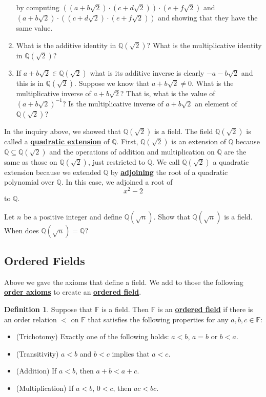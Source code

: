 \documentclass[11pt]{article}
\newenvironment{task}
	{\begin{mdframed}[linecolor=lightgray, linewidth=3pt]\raggedright}
	{\end{mdframed}}
\renewcommand\emph[1]{\underline{\bf{#1}}} %
\theoremstyle{definition}
\newtheorem{definition}[theorem]{Definition}
\begin{document}
\begin{task}
\begin{enumerate}
      by computing $((a+b\sqrt{2})\cdot (c+d\sqrt{2}))\cdot (e + f\sqrt{2})$ and $(a+b\sqrt{2})\cdot ( (c+d\sqrt{2})\cdot (e+f\sqrt{2}) )$ and showing that 
      they have the same value.
    \item What is the additive identity in $\mathbb{Q}(\sqrt{2})$? What is the multiplicative identity in $\mathbb{Q}(\sqrt{2})$?
    \item If $a+b\sqrt{2}\in \mathbb{Q}(\sqrt{2})$ what is its additive inverse is clearly $-a-b\sqrt{2}$ and this is in $\mathbb{Q}(\sqrt{2})$. Suppose
      we know that $a+b\sqrt{2} \neq 0$. What is the multiplicative inverse of $a+b\sqrt{2}$? That is, what is the value of $(a+b\sqrt{2})^{-1}$? Is
      the multiplicative inverse of $a+b\sqrt{2}$ an element of $\mathbb{Q}(\sqrt{2})$?
  \end{enumerate}

\end{task}

In the inquiry above, we showed that $\mathbb{Q}(\sqrt{2})$ is a field.  The field $\mathbb{Q}(\sqrt{2})$ is called a \emph{quadratic extension}
of $\mathbb{Q}$. First, $\mathbb{Q}(\sqrt{2})$ is an extension of $\mathbb{Q}$ because $\mathbb{Q}\subseteq \mathbb{Q}(\sqrt{2})$ and the operations of addition and
multiplication on $\mathbb{Q}$ are the same as those on $\mathbb{Q}(\sqrt{2})$, just restricted to $\mathbb{Q}$. We call $\mathbb{Q}(\sqrt{2})$ a
quadratic extension because we extended $\mathbb{Q}$ by \emph{adjoining} the root of a quadratic polynomial over $\mathbb{Q}$. In this case, we adjoined
a root of
\[ x^2 -2 \]
to $\mathbb{Q}$. 

\begin{task}
  Let $n$ be a positive integer and define $\mathbb{Q}(\sqrt{n})$. Show that $\mathbb{Q}(\sqrt{n})$ is a field. When does $\mathbb{Q}(\sqrt{n})=\mathbb{Q}$?
\end{task}

\subsection{Ordered Fields}

Above we gave the axioms that define a field. We add to those the following \emph{order axioms} to create an \emph{ordered field}.

\begin{definition} Suppose that $\mathbb{F}$ is a field. Then $\mathbb{F}$ is an \emph{ordered field} if there is an order
  relation $<$ on $\mathbb{F}$ that satisfies the following properties for any $a,b,c\in\mathbb{F}$:
\begin{itemize}
  \item (Trichotomy) Exactly one of the following holds: $a < b$, $a=b$ or $b < a$.
  \item (Transitivity) $a< b$ and $b < c$ implies that $a < c$.
  \item (Addition) If $a< b$, then $a+b < a+c$.
  \item (Multiplication) If $a < b$, $0 < c$, then $ac < bc$.
\end{itemize}
\end{definition}
\end{document}
